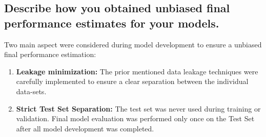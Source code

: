 \subsection{Describe how you obtained unbiased final performance estimates for your models. }
\label{sec:Data Split:c}

Two main aspect were considered during model development to ensure a unbiased final performance estimation:

\begin{enumerate}
	
	\item {\bf Leakage minimization: } The prior mentioned data leakage techniques were carefully implemented to ensure a clear separation between the individual data-sets. 
    
	\item {\bf Strict Test Set Separation: } The test set was never used during training or validation. Final model evaluation was performed only once on the Test Set after all model development was completed.

%	
%
\end{enumerate}




